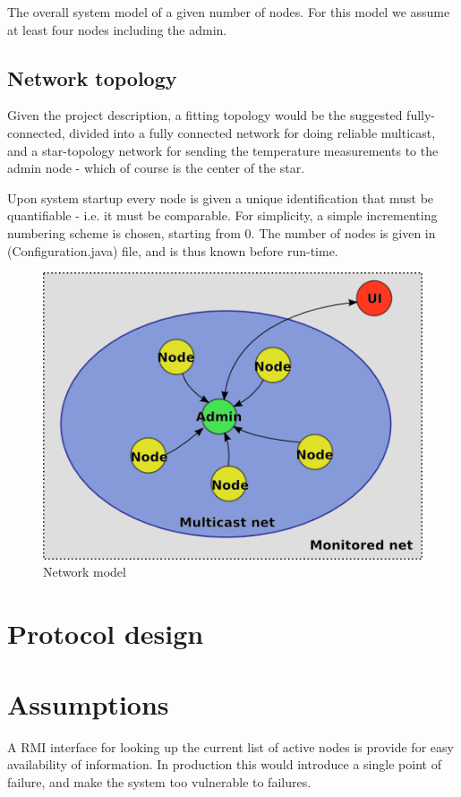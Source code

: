 \documentclass[10pt,a4paper]{article}
\begin{document}
The overall system model of a given number of nodes. For this model we assume at least four nodes including the admin.

\subsection{Network topology}
Given the project description, a fitting topology would be the suggested fully-connected, divided into a fully connected network for doing reliable multicast, and a star-topology network for sending the temperature measurements to the admin node - which of course is the center of the star.

Upon system startup every node is given a unique identification that must be quantifiable - i.e. it must be comparable. For simplicity, a simple incrementing numbering scheme is chosen, starting from 0. The number of nodes is given in \File(Configuration.java) file, and is thus known before run-time.

\begin{figure}[h]
\centering
\includegraphics[scale=0.65]{fig/Networkmodel.png}
 \caption{Network model}
 \label{fig:network_model}
\end{figure}


\section{Protocol design}

\section{Assumptions}
A RMI interface for looking up the current list of active nodes is provide for easy availability of information. In production this would introduce a single point of failure, and make the system too vulnerable to failures.
\end{document}

